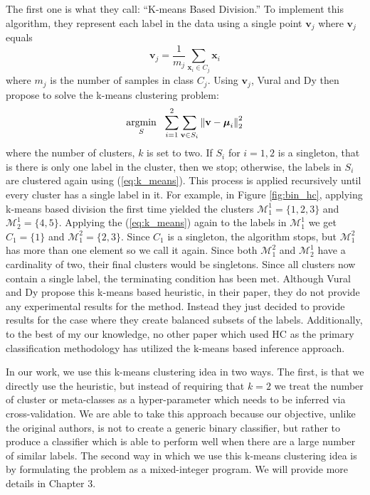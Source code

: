 \documentclass[../thesis.tex]{subfiles}
\begin{document}
The first one is what they call: ``K-means Based Division.'' To implement this algorithm, they represent each label in the data using a single point $\mathbf{v}_j$ where $\mathbf{v}_j$ equals
\begin{equation}
    \mathbf{v}_j = \frac{1}{m_j} \sum_{\mathbf{x}_i \in C_j} \mathbf{x}_i
\end{equation}
where $m_j$ is the number of samples in class $C_j$. Using $\mathbf{v}_j$, Vural and Dy then propose to solve the k-means clustering problem:
\begin{equation}
    \label{eq:k_means}
    \underset{S}{\operatorname*{argmin}} \ \ \sum_{i=1}^2 \sum_{\mathbf{v} \in S_i} \left \Vert \mathbf{v} - \boldsymbol{\mu}_i \right \Vert_2^2
\end{equation}
where the number of clusters, $k$ is set to two. If $S_i$ for $i = 1, 2$ is a singleton, that is there is only one label in the cluster, then we stop; otherwise, the labels in $S_i$ are clustered again using (\ref{eq:k_means}). This process is applied recursively until every cluster has a single label in it. For example, in Figure \ref{fig:bin_hc}, applying k-means based division the first time yielded the clusters $\mathcal{M}_1^1 = \{1, 2, 3\}$ and $\mathcal{M}_2^1 = \{4, 5\}$. Applying the (\ref{eq:k_means}) again to the labels in $\mathcal{M}_1^1$ we get $C_1 = \{1\}$ and $\mathcal{M}_1^2 = \{2, 3\}$. Since $C_1$ is a singleton, the algorithm stops, but $\mathcal{M}_1^2$ has more than one element so we call it again. Since both $\mathcal{M}_1^2$ and $\mathcal{M}_2^1$ have a cardinality of two, their final clusters would be singletons. Since all clusters now contain a single label, the terminating condition has been met. Although Vural and Dy propose this k-means based heuristic, in their paper, they do not provide any experimental results for the method. Instead they just decided to provide results for the case where they create balanced subsets of the labels. Additionally, to the best of my our knowledge, no other paper which used HC as the primary classification methodology has utilized the k-means based inference approach. 

In our work, we use this k-means clustering idea in two ways. The first, is that we directly use the heuristic, but instead of requiring that $k=2$ we treat the number of cluster or meta-classes as a hyper-parameter which needs to be inferred via cross-validation. We are able to take this approach because our objective, unlike the original authors, is not to create a generic binary classifier, but rather to produce a classifier which is able to perform well when there are a large number of similar labels. The second way in which we use this k-means clustering idea is by formulating the problem as a mixed-integer program. We will provide more details in Chapter 3. 
\end{document}
